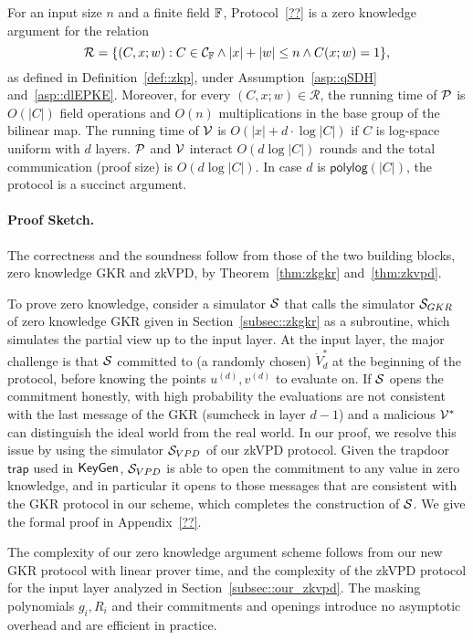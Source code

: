 \begin{theorem}\label{theorem:main}
	For an input size $n$ and a finite field $\F$, Protocol~\ref{??} is a zero knowledge argument for the relation
	\[
	\mathcal{R} = \{(C,x;w): C\in\mathcal{C}_\F\wedge|x|+|w|\le n\wedge C(x;w) = 1\},
	\]
	as defined in Definition~\ref{def::zkp}, under Assumption~\ref{asp::qSDH} and~\ref{asp::dlEPKE}. Moreover, for every $(C,x;w)\in\mathcal{R}$, the running time of $\P$ is $O(|C|)$ field operations and $O(n)$ multiplications in the base group of the bilinear map. The running time of $\V$ is $O(|x|+d\cdot\log |C|)$ if $C$ is log-space uniform with $d$ layers. $\P$ and $\V$ interact $O(d\log |C|)$ rounds and the total communication (proof size) is $O(d\log |C|)$. In case $d$ is $\mathsf{polylog}(|C|)$, the protocol is a succinct argument.
\end{theorem}

\paragraph{Proof Sketch.} The correctness and the soundness follow from those of the two building blocks, zero knowledge GKR and zkVPD, by Theorem~\ref{thm:zkgkr} and~\ref{thm:zkvpd}.

To prove zero knowledge, consider a simulator $\S$ that calls the simulator $\S_{GKR}$ of zero knowledge GKR given in Section~\ref{subsec::zkgkr} as a subroutine, which simulates the partial view up to the input layer. At the input layer, the major challenge is that $\S$ committed to (a randomly chosen) $\dot{V}^*_d$ at the beginning of the protocol, before knowing the points $u^{(d)}, v^{(d)}$ to evaluate on. If $\S$ opens the commitment honestly, with high probability the evaluations are not consistent with the last message of the GKR (sumcheck in layer $d-1$) and a malicious $\V^*$ can distinguish the ideal world from the real world. In our proof, we resolve this issue by using the simulator $\S_{VPD}$ of our zkVPD protocol. Given the trapdoor $\mathsf{trap}$ used in $\KeyGen$, $\S_{VPD}$ is able to open the commitment to any value in zero knowledge, and in particular it opens to those messages that are consistent with the GKR protocol in our scheme, which completes the construction of $\S$. We give the formal proof in Appendix~\ref{??}.  

The complexity of our zero knowledge argument scheme follows from our new GKR protocol with linear prover time, and the complexity of the zkVPD protocol for the input layer analyzed in Section~\ref{subsec::our_zkvpd}. The masking polynomials $g_i, R_i$ and their commitments and openings introduce no asymptotic overhead and are efficient in practice.



